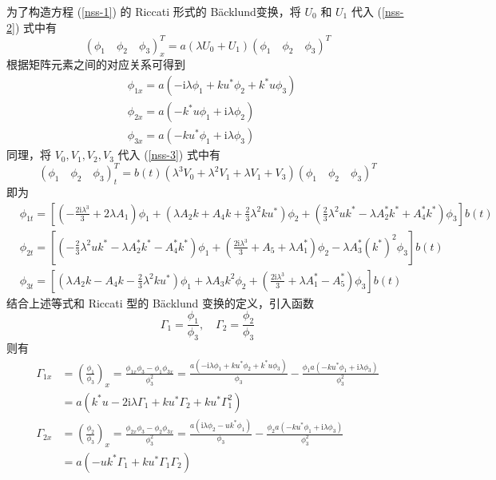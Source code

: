 为了构造方程 (\ref{nss-1}) 的 Riccati 形式的 B\"acklund变换，将 $U_{0}$ 和 $U_{1}$ 代入 (\ref{nss-2}) 式中有
\begin{equation}
  (\phi_{1}\quad \phi_{2}\quad \phi_{3})_{x}^{T} = a(\lambda U_{0} + U_{1})(\phi_{1}\quad \phi_{2}\quad \phi_{3})^{T}
\end{equation}
根据矩阵元素之间的对应关系可得到
\begin{align}
  & \phi_{1x} = a(-\mathrm{i}\lambda\phi_{1} + ku^{*}\phi_{2} +k^{*}u\phi_{3}) \\
  & \phi_{2x} = a(-k^{*}u\phi_{1} + \mathrm{i}\lambda\phi_{2}) \\
  & \phi_{3x} = a(-ku^{*}\phi_{1} + \mathrm{i}\lambda\phi_{3})
\end{align}
同理，将 $V_{0}, V_{1}, V_{2}, V_{3}$ 代入 (\ref{nss-3}) 式中有
\begin{equation}
  (\phi_{1}\quad \phi_{2} \quad \phi_{3})^{T}_{t} = b(t)(\lambda^{3}V_{0} + \lambda^{2}V_{1} + \lambda V_{1} + V_{3})(\phi_{1}\quad \phi_{2} \quad \phi_{3})^{T}
\end{equation}
即为
\begin{align}
  & \phi_{1t} = \left[\left(-\frac{2\mathrm{i}\lambda^{3}}{3}+2\lambda A_{1}\right)\phi_{1} + \left(\lambda A_{2}k+A_{4}k+\frac{2}{3}\lambda^{2}ku^{*}\right)\phi_{2} + \left(\frac{2}{3}\lambda^{2}uk^{*}-\lambda A_{2}^{*}k^{*}+A_{4}^{*}k^{*}\right)\phi_{3}\right]b(t) \\
  & \phi_{2t} = \left[\left(-\frac{2}{3}\lambda^{2}uk^{*}-\lambda A_{2}^{*}k^{*}-A_{4}^{*}k^{*}\right)\phi_{1} + \left(\frac{2\mathrm{i}\lambda^{3}}{3}+A_{5}+\lambda A_{1}^{*}\right)\phi_{2} - \lambda A_{3}^{*}(k^{*})^{2}\phi_{3}\right]b(t) \\
  & \phi_{3t} = \left[\left(\lambda A_{2}k-A_{4}k-\frac{2}{3}\lambda^{2}ku^{*}\right)\phi_{1} + \lambda A_{3}k^{2}\phi_{2} + \left(\frac{2\mathrm{i}\lambda^{3}}{3}+\lambda A_{1}^{*} - A_{5}^{*}\right)\phi_{3}\right]b(t)
\end{align}
结合上述等式和 Riccati 型的 B\"acklund 变换的定义，引入函数
\begin{equation}
  \Gamma_{1} = \frac{\phi_{1}}{\phi_{3}}, \quad \Gamma_{2} = \frac{\phi_{2}}{\phi_{3}}
\end{equation}
则有
\begin{align}
   \Gamma_{1x} &= \left(\frac{\phi_1}{\phi_3}\right)_x=\frac{\phi_{1x}\phi_3-\phi_1\phi_{3x}}{\phi_3^2}=\frac{a(-\mathrm{i}\lambda\phi_1+ku^*\phi_2+k^*u\phi_3)}{\phi_3}-\frac{\phi_1a(-ku^*\phi_1+\mathrm{i}\lambda\phi_3)}{\phi_3^2} \nonumber\\
  &= a(k^{*}u - 2\mathrm{i}\lambda \Gamma_{1} + ku^{*}\Gamma_{2} + ku^{*}\Gamma_{1}^{2}) \label{nss-g1x} \\
  \Gamma_{2x} &=\left(\frac{\phi_2}{\phi_3}\right)_x=\frac{\phi_{2x}\phi_3-\phi_2\phi_{3x}}{\phi_3^2}=\frac{a(\mathrm{i}\lambda\phi_2-uk^*\phi_1)}{\phi_3}-\frac{\phi_2a(-ku^*\phi_1+\mathrm{i}\lambda\phi_3)}{\phi_3^2}\nonumber\\
  &= a(-uk^{*}\Gamma_{1} + ku^{*}\Gamma_{1}\Gamma_{2}) \label{nss-g2x}
\end{align}
